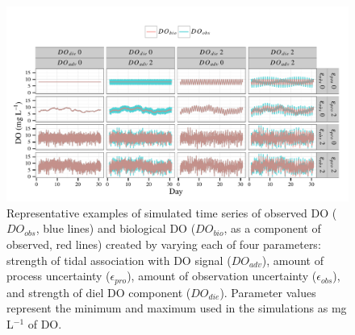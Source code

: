 \documentclass[letterpaper,12pt,oneside]{article}\usepackage[]{graphicx}\usepackage[]{color}
\newenvironment{knitrout}{}{} %
\begin{document}
\centering\vspace*{\fill}
\begin{knitrout}
\color{fgcolor}\begin{figure}[!ht]


{\centering \includegraphics[width=\textwidth]{figure/sim_ex} 

}

\caption[Representative examples of simulated time series of observed \ac{DO} ($DO_{obs}$, blue lines) and biological \ac{DO} ($DO_{bio}$, as a component of observed, red lines) created by varying each of four parameters]{Representative examples of simulated time series of observed \ac{DO} ($DO_{obs}$, blue lines) and biological \ac{DO} ($DO_{bio}$, as a component of observed, red lines) created by varying each of four parameters: strength of tidal association with \ac{DO} signal ($DO_{adv}$), amount of process uncertainty ($\epsilon_{pro}$), amount of observation uncertainty ($\epsilon_{obs}$), and strength of diel \ac{DO} component ($DO_{die}$).  Parameter values represent the minimum and maximum used in the simulations as mg L$^{-1}$ of \ac{DO}.\label{fig:sim_ex}}
\end{figure}


\end{knitrout}
\vfill
\clearpage
\end{document}
